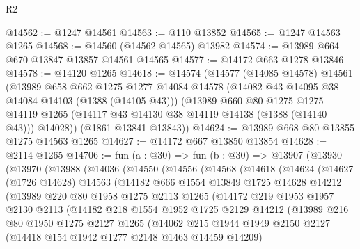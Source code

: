 \begin{lexlean}{R2}
\begin{coremodule}
@14562 := @1247 @14561
@14563 := @110 @13852
@14565 := @1247 @14563 @1265
@14568 := @14560 (@14562 @14565) @13982
@14574 := @13989 @664 @670 @13847 @13857 @14561 @14565
@14577 := @14172 @663 @1278 @13846
@14578 := @14120 @1265
@14618 := @14574
    (@14577
      (@14085 @14578)
      @14561
      (@13989
        @658
        @662
        @1275
        @1277
        @14084
        @14578
        (@14082 @43 @14095 @38 @14084 @14103 (@1388 (@14105 @43)))
        (@13989
          @660
          @80
          @1275
          @1275
          @14119
          @1265
          (@14117 @43 @14130 @38 @14119 @14138 (@1388 (@14140 @43)))
          @14028))
      (@1861 @13841 @13843))
@14624 := @13989 @668 @80 @13855 @1275 @14563 @1265
@14627 := @14172 @667 @13850 @13854
@14628 := @2114 @1265
@14706 := fun (a : @30) =>
  fun (b : @30) =>
  @13907
    (@13930
      (@13970
        (@13988
          (@14036
            (@14550
              (@14556
                (@14568
                  (@14618
                    (@14624
                      (@14627
                        (@1726 @14628)
                        @14563
                        (@14182
                          @666
                          @1554
                          @13849
                          @1725
                          @14628
                          @14212
                          (@13989
                            @220
                            @80
                            @1958
                            @1275
                            @2113
                            @1265
                            (@14172
                              @219
                              @1953
                              @1957
                              @2130
                              @2113
                              (@14182
                                @218
                                @1554
                                @1952
                                @1725
                                @2129
                                @14212
                                (@13989
                                  @216
                                  @80
                                  @1950
                                  @1275
                                  @2127
                                  @1265
                                  (@14062
                                    @215
                                    @1944
                                    @1949
                                    @2150
                                    @2127
                                    (@14418 @154 @1942 @1277 @2148 @1463 @14459 @14209)

\end{coremodule}
\end{lexlean}
